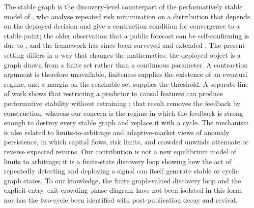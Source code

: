 \documentclass[11pt]{article}
\theoremstyle{plain}
\theoremstyle{definition}
\begin{document}
The stable graph is the discovery-level counterpart of the performatively stable model of \citet{perdomo2020}, who analyse repeated risk minimisation on a distribution that depends on the deployed decision and give a contraction condition for convergence to a stable point; the older observation that a public forecast can be self-confirming is due to \citet{grunberg1954}, and the framework has since been surveyed and extended \citep{hardt2023past, mendlerdunner2022anticipating}. The present setting differs in a way that changes the mathematics: the deployed object is a graph drawn from a finite set rather than a continuous parameter. A contraction argument is therefore unavailable, finiteness supplies the existence of an eventual regime, and a margin on the reachable set supplies the threshold. A separate line of work shows that restricting a predictor to causal features can produce performative stability without retraining \citep{kulynych2022causal}; that result removes the feedback by construction, whereas our concern is the regime in which the feedback is strong enough to destroy every stable graph and replace it with a cycle. The mechanism is also related to limits-to-arbitrage and adaptive-market views of anomaly persistence, in which capital flows, risk limits, and crowded unwinds attenuate or reverse expected returns. Our contribution is not a new equilibrium model of limits to arbitrage; it is a finite-state discovery loop showing how the act of repeatedly detecting and deploying a signal can itself generate stable or cyclic graph states. To our knowledge, the finite graph-valued discovery loop and the explicit entry--exit crowding phase diagram have not been isolated in this form, nor has the two-cycle been identified with post-publication decay and revival.
\end{document}
